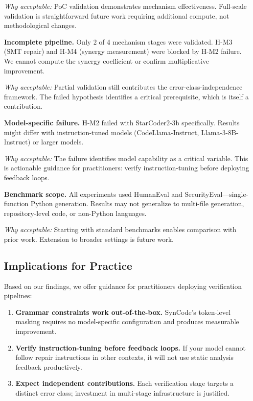 \emph{Why acceptable:} PoC validation demonstrates mechanism effectiveness. Full-scale validation is straightforward future work requiring additional compute, not methodological changes.

\textbf{Incomplete pipeline.} Only 2 of 4 mechanism stages were validated. H-M3 (SMT repair) and H-M4 (synergy measurement) were blocked by H-M2 failure. We cannot compute the synergy coefficient or confirm multiplicative improvement.

\emph{Why acceptable:} Partial validation still contributes the error-class-independence framework. The failed hypothesis identifies a critical prerequisite, which is itself a contribution.

\textbf{Model-specific failure.} H-M2 failed with StarCoder2-3b specifically. Results might differ with instruction-tuned models (CodeLlama-Instruct, Llama-3-8B-Instruct) or larger models.

\emph{Why acceptable:} The failure identifies model capability as a critical variable. This is actionable guidance for practitioners: verify instruction-tuning before deploying feedback loops.

\textbf{Benchmark scope.} All experiments used HumanEval and SecurityEval---single-function Python generation. Results may not generalize to multi-file generation, repository-level code, or non-Python languages.

\emph{Why acceptable:} Starting with standard benchmarks enables comparison with prior work. Extension to broader settings is future work.

\subsection{Implications for Practice}

Based on our findings, we offer guidance for practitioners deploying verification pipelines:

\begin{enumerate}
    \item \textbf{Grammar constraints work out-of-the-box.} SynCode's token-level masking requires no model-specific configuration and produces measurable improvement.

    \item \textbf{Verify instruction-tuning before feedback loops.} If your model cannot follow repair instructions in other contexts, it will not use static analysis feedback productively.

    \item \textbf{Expect independent contributions.} Each verification stage targets a distinct error class; investment in multi-stage infrastructure is justified.
\end{enumerate}


